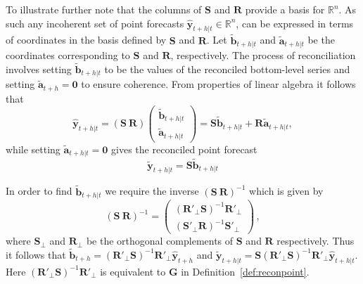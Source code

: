 \documentclass[a4paper, 11pt]{article}
\theoremstyle{theo}
\theoremstyle{definition}
\begin{document}
To illustrate further note that the columns of $\bm{S}$ and $\bm{R}$ provide a basis for $\mathbb{R}^n$.  As such any incoherent set of point forecasts $\hat{\bm{y}}_{t+h|t} \in \mathbb{R}^n$, can be expressed in terms of coordinates in the basis defined by $\bm{S}$ and $\bm{R}$. Let $\tilde{\bm{b}}_{t+h|t}$ and $\tilde{\bm{a}}_{t+h|t}$ be the coordinates corresponding to $\bm{S}$ and $\bm{R}$, respectively. The process of reconciliation involves setting $\tilde{\bm{b}}_{t+h|t}$ to be the values of the reconciled bottom-level series and setting $\tilde{\bm{a}}_{t+h}=\bm{0}$ to ensure coherence. From properties of linear algebra it follows that 
\[
\hat{\bm{y}}_{t+h|t} = (\bm{S} ~ \bm{R})
\begin{pmatrix}
\tilde{\bm{b}}_{t+h|t}\\ \tilde{\bm{a}}_{t+h|t}
\end{pmatrix}= \bm{S}\tilde{\bm{b}}_{t+h|t} +  \bm{R}\tilde{\bm{a}}_{t+h|t},
\]
while setting $\tilde{\bm{a}}_{t+h|t}=\bm{0}$ gives the reconciled point forecast
\[
\tilde{\bm{y}}_{t+h|t} = \bm{S}\tilde{\bm{b}}_{t+h|t}
\]


In order to find $\tilde{\bm{b}}_{t+h|t}$ we require the inverse $(\bm{S} ~ \bm{R})^{-1}$ which is given by
\begin{equation}
(\bm{S} ~  \bm{R})^{-1} = \begin{pmatrix}
(\bm{R}'_\bot \bm{S})^{-1}\bm{R}'_\bot \\ (\bm{S}'_\bot \bm{R})^{-1}\bm{S}'_\bot
\end{pmatrix}\,,
\end{equation}
where $\bm{S}_{\bot}$ and $\bm{R}_{\bot}$ be the orthogonal complements of $\bm{S}$ and $\bm{R}$
respectively. Thus it follows that $\tilde{\bm{b}}_{t+h}=(\bm{R}'_\bot \bm{S})^{-1}\bm{R}'_\bot \hat{\bm{y}}_{t+h}$ and $\tilde{\bm{y}}_{t+h|t}=\bm{S}(\bm{R}'_\bot \bm{S})^{-1}\bm{R}'_\bot \hat{\bm{y}}_{t+h|t}$.  Here $(\bm{R}'_\bot \bm{S})^{-1}\bm{R}'_\bot$ is equivalent to $\bm{G}$ in Definition~\ref{def:reconpoint}.
\end{document}
